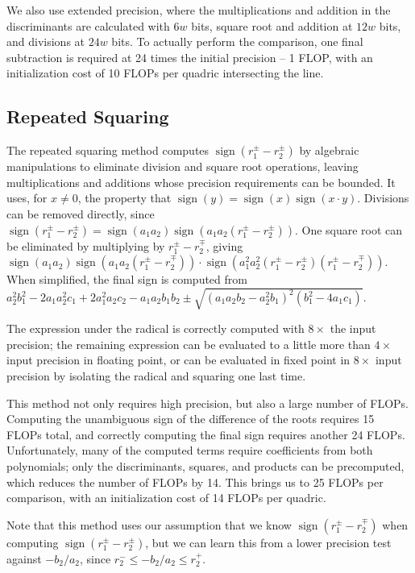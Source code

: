 \documentclass{cccg16}
\DeclareMathOperator{\sign}{sign}
\begin{document}
We also use extended precision, where the multiplications and addition
in the discriminants are calculated with $6w$ bits, square root and
addition at $12w$ bits, and divisions at $24w$ bits.  To actually
perform the comparison, one final subtraction is required at 24 times
the initial precision -- 1 FLOP, with an initialization cost of 10
FLOPs per quadric intersecting the line.

\subsection{Repeated Squaring}
The repeated squaring method computes $\sign(r_1^\pm-r_2^\pm)$ by
algebraic manipulations to eliminate division and square root
operations, leaving multiplications and additions whose precision
requirements can be bounded.  It uses, for $x\ne 0$, the property that
$\sign(y)=\sign(x)\sign(x\cdot y)$.  Divisions can be removed
directly, since $\sign(r_1^\pm-r_2^\pm)=\sign(a_1 a_2)\sign(a_1 a_2
(r_1^\pm-r_2^\pm))$.  One square root can be eliminated by multiplying
by $r_1^\pm-r_2^\mp$, giving~$\sign(a_1 a_2)\sign(a_1 a_2
(r_1^\pm-r_2^\mp))\cdot\sign(a_1^2 a_2^2 (r_1^\pm - r_2^\pm) (r_1^\pm
- r_2^\mp))$.  When simplified, the final sign is computed
from~$a_2^2b_1^2-2a_1a_2^2c_1+2a_1^2a_2c_2-a_1a_2b_1b_2\pm
\sqrt{(a_1a_2b_2-a_2^2b_1)^2(b_1^2-4a_1c_1)}$.

The expression under the radical is correctly computed with $8\times$
the input precision; the remaining expression can be evaluated to a
little more than $4\times$ input precision in floating point, or can
be evaluated in fixed point in $8\times$ input precision by isolating
the radical and squaring one last time.

This method not only requires high precision, but also a large number
of FLOPs.  Computing the unambiguous sign of the difference of the
roots requires 15 FLOPs total, and correctly computing the final sign
requires another 24 FLOPs.  Unfortunately, many of the computed terms
require coefficients from both polynomials; only the discriminants,
squares, and products can be precomputed, which reduces the number of
FLOPs by 14.  This brings us to 25 FLOPs per comparison, with an
initialization cost of 14 FLOPs per quadric.

Note that this method uses our assumption that we know
$\sign(r_1^\pm-r_2^\mp)$ when computing $\sign(r_1^\pm-r_2^\pm)$, but
we can learn this from a lower precision test against $-b_2/a_2$,
since $r_2^- \le -b_2/a_2 \le r_2^+$.
\end{document}
